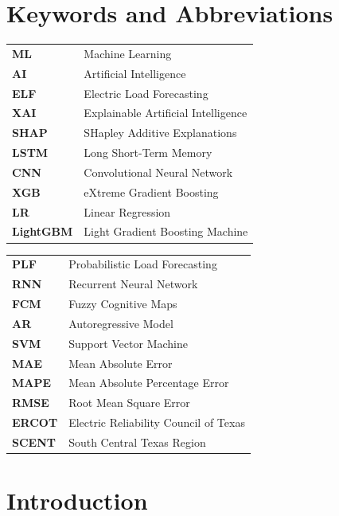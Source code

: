 \documentclass[final,numbered]{ifacconf}
\begin{document}
\section*{Keywords and Abbreviations}
\begin{tcolorbox}[colback=white!100!gray, colframe=black, title=Keywords and Abbreviations, width=0.45\textwidth]
\footnotesize
\begin{tabular}{ll}
\textbf{ML} & Machine Learning \\
\textbf{AI} & Artificial Intelligence \\
\textbf{ELF} & Electric Load Forecasting \\
\textbf{XAI} & Explainable Artificial Intelligence \\
\textbf{SHAP} & SHapley Additive Explanations \\
\textbf{LSTM} & Long Short-Term Memory \\
\textbf{CNN} & Convolutional Neural Network \\
\textbf{XGB} & eXtreme Gradient Boosting \\
\textbf{LR} & Linear Regression \\
\textbf{LightGBM} & Light Gradient Boosting Machine \\
\end{tabular}
\hfill
\begin{tabular}{ll}
\textbf{PLF} & Probabilistic Load Forecasting \\
\textbf{RNN} & Recurrent Neural Network \\
\textbf{FCM} & Fuzzy Cognitive Maps \\
\textbf{AR} & Autoregressive Model \\
\textbf{SVM} & Support Vector Machine \\
\textbf{MAE} & Mean Absolute Error \\
\textbf{MAPE} & Mean Absolute Percentage Error \\
\textbf{RMSE} & Root Mean Square Error \\
\textbf{ERCOT} & Electric Reliability Council of Texas \\
\textbf{SCENT} & South Central Texas Region \\
\end{tabular}
\end{tcolorbox}


\section{Introduction}
\end{document}
